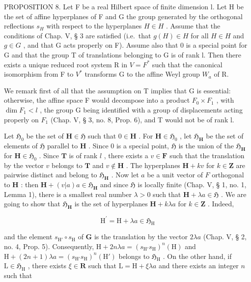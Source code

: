PROPOSITION 8. Let F be a real Hilbert space of finite dimension l. Let H be the set of affine hyperplanes of F and G the group generated by the orthogonal reflections \(s_{H}\) with respect to the hyperplanes \(H \in H\) . Assume that the conditions of Chap. V, § 3 are satisfied (i.e.~that \(g(H) \in H\) for all \(H \in H\) and \(g \in G\) , and that G acts properly on F). Assume also that 0 is a special point for G and that the group T of translations belonging to G is of rank l. Then there exists a unique reduced root system R in \(V = F^{*}\) such that the canonical isomorphism from F to \(V^{*}\) transforms G to the affine Weyl group \(W_{a}\) of R.

We remark first of all that the assumption on T implies that G is essential: otherwise, the affine space F would decompose into a product \(F_{0} \times F_{1}\) , with \(\dim F_{1} < l\) , the group G being identified with a group of displacements acting properly on \(F_{1}\) (Chap. V, § 3, no. 8, Prop. 6), and T would not be of rank l.

Let \(\mathfrak{H}_0\) be the set of \(\mathbf{H} \in \mathfrak{H}\) such that \(0 \in \mathbf{H}\) . For \(\mathbf{H} \in \mathfrak{H}_0\) , let \(\mathfrak{H}_{\mathbf{H}}\) be the set of elements of \(\mathfrak{H}\) parallel to \(\mathbf{H}\) . Since 0 is a special point, \(\mathfrak{H}\) is the union of the \(\mathfrak{H}_{\mathbf{H}}\) for \(\mathbf{H} \in \mathfrak{H}_0\) . Since \(\mathbf{T}\) is of rank \(l\) , there exists a \(v \in \mathbf{F}\) such that the translation by the vector \(v\) belongs to \(\mathbf{T}\) and \(v \notin \mathbf{H}\) . The hyperplanes \(\mathbf{H} + kv\) for \(k \in \mathbf{Z}\) are pairwise distinct and belong to \(\mathfrak{H}_{\mathbf{H}}\) . Now let \(a\) be a unit vector of \(F\) orthogonal to \(\mathbf{H}\) : then \(\mathbf{H} + (v|a)a \in \mathfrak{H}_{\mathbf{H}}\) and since \(\mathfrak{H}\) is locally finite (Chap. V, § 1, no. 1, Lemma 1), there is a smallest real number \(\lambda > 0\) such that \(\mathbf{H} + \lambda a \in \mathfrak{H}\) . We are going to show that \(\mathfrak{H}_{\mathbf{H}}\) is the set of hyperplanes \(\mathbf{H} + k\lambda a\) for \(k \in \mathbf{Z}\) . Indeed,

\[
\mathrm{H} ^ {\prime} = \mathrm{H} + \lambda a \in \mathfrak {H} _ {\mathrm{H}}
\]

and the element \(s_{\mathrm{H}'} \circ s_{\mathrm{H}}\) of \(\mathbf{G}\) is the translation by the vector \(2\lambda a\) (Chap. V, § 2, no. 4, Prop. 5). Consequently, \(\mathrm{H} + 2n\lambda a = (s_{\mathrm{H}'}s_{\mathrm{H}})^n(\mathrm{H})\) and \(\mathrm{H} + (2n + 1)\lambda a = (s_{\mathrm{H}'}s_{\mathrm{H}})^n(\mathrm{H}')\) belongs to \(\mathfrak{H}_{\mathrm{H}}\) . On the other hand, if \(\mathrm{L} \in \mathfrak{H}_{\mathrm{H}}\) , there exists \(\xi \in \mathbf{R}\) such that \(\mathrm{L} = \mathrm{H} + \xi \lambda a\) and there exists an integer \(n\) such that

